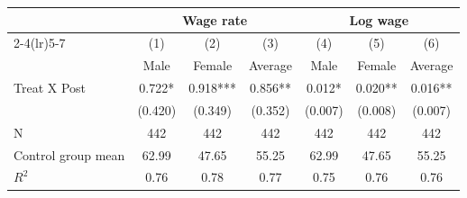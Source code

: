 {
\def\sym#1{\ifmmode^{#1}\else\(^{#1}\)\fi}
\begin{tabular}{l*{6}{c}}
\hline\hline
                         &\multicolumn{3}{c}{Wage rate}                  &\multicolumn{3}{c}{Log wage}                   \\\cmidrule(lr){2-4}\cmidrule(lr){5-7}
                         &\multicolumn{1}{c}{(1)}&\multicolumn{1}{c}{(2)}&\multicolumn{1}{c}{(3)}&\multicolumn{1}{c}{(4)}&\multicolumn{1}{c}{(5)}&\multicolumn{1}{c}{(6)}\\
                         &\multicolumn{1}{c}{Male}&\multicolumn{1}{c}{Female}&\multicolumn{1}{c}{Average}&\multicolumn{1}{c}{Male}&\multicolumn{1}{c}{Female}&\multicolumn{1}{c}{Average}\\
\hline
Treat X Post             &       0.722*  &       0.918***&       0.856** &       0.012*  &       0.020** &       0.016** \\
                         &     (0.420)   &     (0.349)   &     (0.352)   &     (0.007)   &     (0.008)   &     (0.007)   \\
\hline
N                        &         442   &         442   &         442   &         442   &         442   &         442   \\
Control group mean       &       62.99   &       47.65   &       55.25   &       62.99   &       47.65   &       55.25   \\
$ R^{2} $                &        0.76   &        0.78   &        0.77   &        0.75   &        0.76   &        0.76   \\
\hline\hline
\end{tabular}
}
